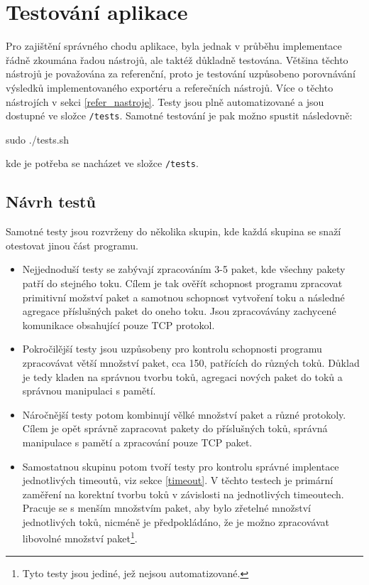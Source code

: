 \documentclass[11pt, a4paper, hidelinks]{article}[08.10.2023]
\begin{document}
    \pagebreak
    
    \section{Testování aplikace}\label{test_zac}
    Pro zajištění správného chodu aplikace, byla jednak v průběhu implementace řádně zkoumána řadou nástrojů, ale taktéž důkladně testována. Většina těchto nástrojů je považována za referenční, proto je testování uzpůsobeno porovnávání výsledků implementovaného exportéru a referečních nástrojů. Více o těchto nástrojích v sekci \ref{refer_nastroje}. Testy jsou plně automatizované a jsou dostupné ve složce \texttt{/tests}. Samotné testování je pak možno spustit následovně:

    \begin{center}
        sudo ./tests.sh
    \end{center}
    kde je potřeba se nacházet ve složce \texttt{/tests}.
    \subsection{Návrh testů}\label{test_navrh}
    Samotné testy jsou rozvrženy do několika skupin, kde každá skupina se snaží otestovat jinou část programu. 

    \begin{itemize}
        \item{Nejjednoduší testy se zabývají zpracováním 3-5 paket, kde všechny pakety patří do stejného toku. Cílem je tak ověřít schopnost programu zpracovat primitivní možství paket a samotnou schopnost vytvoření toku a následné agregace příslušných paket do oneho toku. Jsou zpracovávány zachycené komunikace obsahující pouze TCP protokol.} 
        \item{Pokročilější testy jsou uzpůsobeny pro kontrolu schopnosti programu zpracovávat větší množství paket, cca 150, patřících do různých toků. Důklad je tedy kladen na správnou tvorbu toků, agregaci nových paket do toků a správnou manipulaci s pamětí.}
        \item{Náročnější testy potom kombinují vělké množství paket a různé protokoly. Cílem je opět správně zapracovat pakety do příslušných toků, správná manipulace s pamětí a zpracování pouze TCP paket.}
        \item{Samostatnou skupinu potom tvoří testy pro kontrolu správné implentace jednotlivých timeoutů, viz sekce \ref{timeout}. V těchto testech je primární zaměření na korektní tvorbu toků v závislosti na jednotlivých timeoutech. Pracuje se s menším množstvím paket, aby bylo zřetelné množství jednotlivých toků, nicméně je předpokládáno, že je možno zpracovávat libovolné množství paket\footnote{Tyto testy jsou jediné, jež nejsou automatizované.}.}
    \end{itemize}
  
\end{document}
